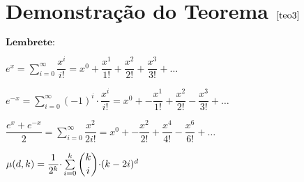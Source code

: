  
\section{Demonstração do Teorema $\ref{teo3}$} \newl

$\textbf{Lembrete:}$ \newl

$e^x = \sum\limits_{i = 0}^{\infty}\dfrac{x^i}{i!} = x^0 + \dfrac{x^1}{1!} + \dfrac{x^2}{2!} + \dfrac{x^3}{3!} + \ldots$ \newl

$e^{-x} = \sum\limits_{i = 0}^{\infty}(-1)^i {\cdot } \dfrac{ x^i}{i!} = x^0 +-\dfrac{x^1}{1!} + \dfrac{x^2}{2!} - \dfrac{x^3}{3!} + \ldots$ \newl

$\dfrac{e^x + e^{-x}}{2} = \sum\limits_{i = 0}^{\infty}  \dfrac{ x^{2}}{2i!} = x^0 +-\dfrac{x^2}{2!} + \dfrac{x^4}{4!} - \dfrac{x^6}{6!} + \ldots$ \newl

\vspace{5mm}

\begin{lema}
	\label{lema6}
	$\mu(d, k) = \dfrac{1}{2^k} {\cdot} \sum\limits_{i = 0}^{k} \escolhe{k}{i} {\cdot} (k - 2i)^{d}$
\end{lema}

